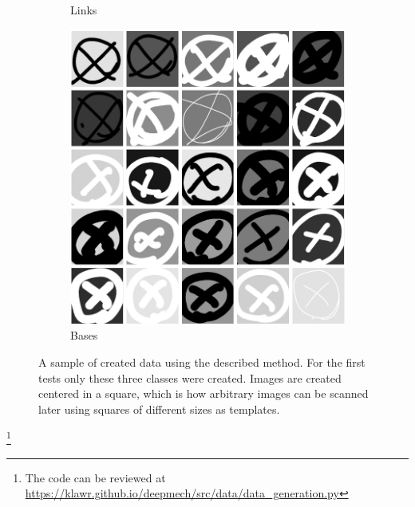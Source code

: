 \begin{figure}
\begin{subfigure}[b]{0.3\textwidth}
        \caption{Links}
        \label{fig:25_links}
    \end{subfigure}
    \begin{subfigure}[b]{0.3\textwidth}
        \includegraphics[width=\textwidth]{images/25_x.png}
        \caption{Bases}
        \label{fig:25_bases}
    \end{subfigure}
    \caption{A sample of created data using the described method. For the first tests only these three classes were created. Images are created centered in a square, which is how arbitrary images can be scanned later using squares of different sizes as templates. }
\end{figure}

\footnote{The code can be reviewed at \url{https://klawr.github.io/deepmech/src/data/data_generation.py}} %
